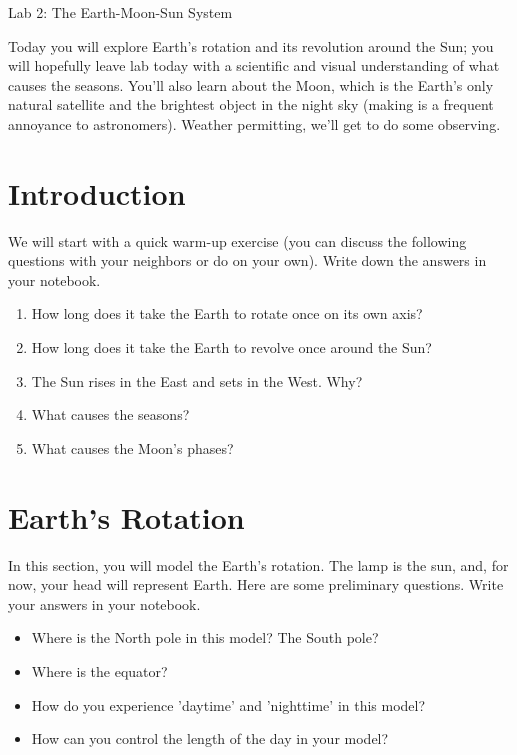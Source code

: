 \documentclass[12pt]{article}%
\begin{document}
\begin{center}
    \LARGE Lab 2: The Earth-Moon-Sun System
\end{center}

Today you will explore Earth's rotation and its revolution around the Sun; you will hopefully leave lab today with a scientific and visual understanding of what causes the seasons. You'll also learn about the Moon, which is the Earth's only natural satellite and the brightest object in the night sky (making is a frequent annoyance to astronomers).  Weather permitting, we'll get to do some observing.

\section{Introduction}

We will start with a quick warm-up exercise (you can discuss the following questions with your neighbors or do on your own). Write down the answers in your notebook.
\begin{enumerate}
\item How long does it take the Earth to rotate once on its own axis?
\item How long does it take the Earth to revolve once around the Sun?
\item The Sun rises in the East and sets in the West. Why?
\item What causes the seasons?
\item What causes the Moon's phases?
\end{enumerate}


\section{Earth's Rotation}

In this section, you will model the Earth's rotation.  The lamp is the sun, and, for now, your head will represent Earth.  Here are some preliminary questions. Write your answers in your notebook.
\begin{itemize}
	\item Where is the North pole in this model? The South pole?
	\item Where is the equator?
	\item How do you experience 'daytime' and 'nighttime' in this model?
	\item How can you control the length of the day in your model?
\end{itemize}
\end{document}
